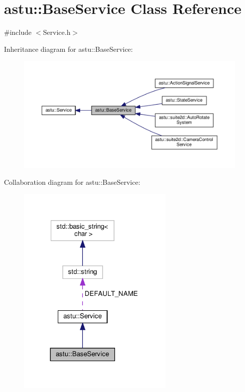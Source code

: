 \hypertarget{classastu_1_1BaseService}{}\section{astu\+:\+:Base\+Service Class Reference}
\label{classastu_1_1BaseService}


{\ttfamily \#include $<$Service.\+h$>$}



Inheritance diagram for astu\+:\+:Base\+Service\+:\nopagebreak
\begin{figure}[H]
\begin{center}
\leavevmode
\includegraphics[width=350pt]{classastu_1_1BaseService__inherit__graph}
\end{center}
\end{figure}


Collaboration diagram for astu\+:\+:Base\+Service\+:\nopagebreak
\begin{figure}[H]
\begin{center}
\leavevmode
\includegraphics[width=213pt]{classastu_1_1BaseService__coll__graph}
\end{center}
\end{figure}
